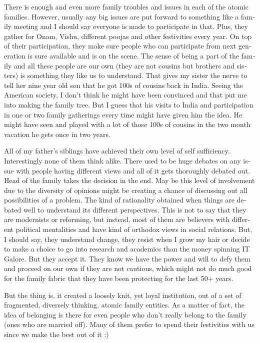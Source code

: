 \begin{english}
There is enough and even more family troubles and issues in each of the atomic families. However, usually any 
big issues are put forward to something like a family meeting and I should say everyone is made 
to participate in that. Plus, they gather for Onam, Vishu, different poojas and other festivities 
every year. On top of their participation, they make sure people who can participate from next
generation is sure available and is on the scene. The sense of being a part of the family and all these 
people are our own (they are not cousins but brothers and sisters) is something they like us to
understand. That gives my sister the nerve to tell her nine year old son that he got 100s of 
cousins back in India. Seeing the American society, I don't think he might have been convinced 
and that put me into making the family tree. But I guess that his visits to India and participation in one or 
two family gatherings every time might have given him the idea. He might have seen and 
played with a lot of those 100s of cousins in the two month vacation he gets once in two years. 

All of my father's siblings have achieved their own level of self sufficiency. Interestingly none of 
them think alike. There used to be huge debates on any issue with people having different views and all of it gets
thoroughly debated out. Head of the family takes the decision in the end. May be this level of
involvement due to the diversity of opinions might be creating a chance of discussing out all 
possibilities of a problem. The kind of rationality obtained when things are debated well to 
understand its different perspectives. This is not to say that they are modernists or reforming, but instead, most 
of them are believers with different political mentalities and have kind of orthodox views in 
social relations. But, I should say, they understand change, they resist when I grow my hair or 
decide to make a choice to go into research and academics than the money spinning IT Galore. 
But they accept it. They know we have the power and will to defy them and proceed on our own 
if they are not cautious, which might not do much good for the family fabric that they have been protecting 
for the last 50+ years.

But the thing is, it created a loosely knit, yet loyal institution, out of a set of fragmented, diversely
thinking, atomic family entities. As a matter of fact, the idea of belonging is there for even people who don't really 
belong to the family (ones who are married off). Many of them prefer to spend their
festivities with us since we make the best out of it :) 


\end{english}
